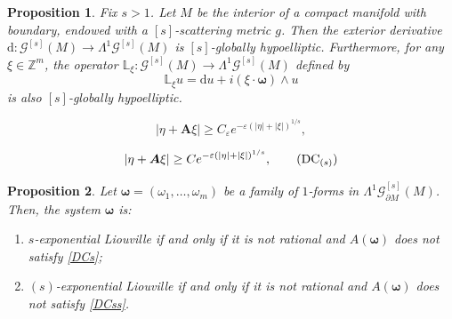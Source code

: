 \documentclass[10pt,a4paper]{amsart}
\newtheorem{proposition}{Proposition}
\begin{document}
	\begin{proposition}\label{gev_gh}
		Fix $s>1$. Let $M$ be the interior of a compact manifold with boundary, endowed with a ${[s]}$-scattering metric $g$. Then the exterior derivative $\mathrm{d}:\mathscr{G}^{[s]}(M)\to\mathsf{\Lambda}^1\mathscr{G}^{[s]}(M)$ is ${[s]}$-globally hypoelliptic. Furthermore, for any $\xi \in \mathbb{Z}^m$, the operator $\mathbb{L}_\xi:\mathscr{G}^{[s]}(M)\to\mathsf{\Lambda}^1\mathscr{G}^{[s]}(M)$ defined by
		\[
		\mathbb{L}_\xi u = \mathrm{d}u + i(\xi\cdot\boldsymbol{\omega})\wedge u
		\]
		is also ${[s]}$-globally hypoelliptic.
	\end{proposition}

			\begin{equation}\label{DCs}
				|\eta+\boldsymbol{A}\xi|
				\geq
				C_\varepsilon
				e^{-\varepsilon (|\eta|+|\xi|)^{1/s}},
				\tag{DC$_s$}
			\end{equation}

			\begin{equation}\label{DCss}
				|\eta+\boldsymbol{A}\xi|
				\geq
				C
				e^{-\varepsilon (|\eta|+|\xi|)^{1/s}},
				\tag{DC$_{(s)}$}
			\end{equation}

	\begin{proposition}\label{liou_DCs}
		Let $\boldsymbol{\omega}=(\omega_1,\dots,\omega_m)$ be a family of $1$-forms in 
		$\mathsf{\Lambda}^1\mathscr{G}^{[s]}_{\partial M}(M)$. Then, the system $\boldsymbol{\omega}$ is:
		\begin{enumerate}
			\item[(i)] $s$-exponential Liouville if and only if it is not rational and 
			$A(\boldsymbol{\omega})$ does not satisfy \eqref{DCs};
			
			\item[(ii)] $(s)$-exponential Liouville if and only if it is not rational and 
			$A(\boldsymbol{\omega})$ does not satisfy \eqref{DCss}.
		\end{enumerate}
	\end{proposition}
\end{document}
